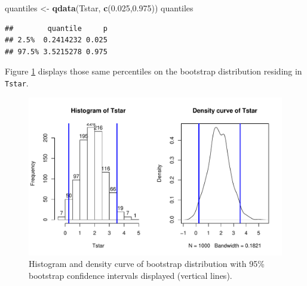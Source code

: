 \documentclass[]{book}
\newenvironment{Shaded}{\begin{snugshade}}{\end{snugshade}}
\newcommand{\KeywordTok}[1]{\textcolor[rgb]{0.13,0.29,0.53}{\textbf{#1}}}
\newcommand{\DataTypeTok}[1]{\textcolor[rgb]{0.13,0.29,0.53}{#1}}
\newcommand{\DecValTok}[1]{\textcolor[rgb]{0.00,0.00,0.81}{#1}}
\newcommand{\FloatTok}[1]{\textcolor[rgb]{0.00,0.00,0.81}{#1}}
\newcommand{\StringTok}[1]{\textcolor[rgb]{0.31,0.60,0.02}{#1}}
\newcommand{\OperatorTok}[1]{\textcolor[rgb]{0.81,0.36,0.00}{\textbf{#1}}}
\newcommand{\NormalTok}[1]{#1}
\theoremstyle{definition}
\theoremstyle{definition}
\theoremstyle{remark}
\begin{document}
\begin{Shaded}
\begin{Highlighting}[]
\NormalTok{quantiles <-}\StringTok{ }\KeywordTok{qdata}\NormalTok{(Tstar, }\KeywordTok{c}\NormalTok{(}\FloatTok{0.025}\NormalTok{,}\FloatTok{0.975}\NormalTok{))}
\NormalTok{quantiles}
\end{Highlighting}
\end{Shaded}

\begin{verbatim}
##        quantile     p
## 2.5%  0.2414232 0.025
## 97.5% 3.5215278 0.975
\end{verbatim}

Figure \ref{fig:Figure2-19} displays those same percentiles on the
bootstrap distribution residing in \texttt{Tstar}.




\begin{figure}
\centering
\includegraphics{02-reintroductionToStatistics_files/figure-latex/Figure2-19-1.pdf}
\caption{\label{fig:Figure2-19}Histogram and density curve of bootstrap distribution with
95\% bootstrap confidence intervals displayed (vertical lines).}
\end{figure}

\begin{Shaded}
\end{Shaded}
\end{document}
